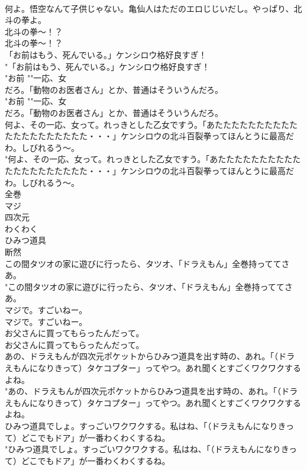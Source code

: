 \documentclass[8pt]{extreport}
\begin{document}
\begin{CJK}{UTF8}{min}
\\	何よ。悟空なんて子供じゃない。亀仙人はただのエロじじいだし。やっぱり、北斗の拳よ。 
\\	北斗の拳～！？	
\\	北斗の拳～！？ 
\\	「お前はもう、死んでいる。」ケンシロウ格好良すぎ！	
\\	"「お前はもう、死んでいる。」ケンシロウ格好良すぎ！ 
\\	"お前 ""一応、女
\\	だろ。「動物のお医者さん」とか、普通はそういうんだろ。
\\	"お前 ""一応、女
\\	だろ。「動物のお医者さん」とか、普通はそういうんだろ。 
\\	何よ、その一応、女って。れっきとした乙女ですう。「あたたたたたたたたたたたたたたたたたたたた・・・」ケンシロウの北斗百裂拳ってほんとうに最高だわ。しびれるう～。	
\\	"何よ、その一応、女って。れっきとした乙女ですう。「あたたたたたたたたたたたたたたたたたたたた・・・」ケンシロウの北斗百裂拳ってほんとうに最高だわ。しびれるう～。 
\\	全巻
\\	マジ
\\	四次元
\\	わくわく
\\	ひみつ道具
\\	断然
\\	この間タツオの家に遊びに行ったら、タツオ、「ドラえもん」全巻持っててさあ。	
\\	"この間タツオの家に遊びに行ったら、タツオ、「ドラえもん」全巻持っててさあ。 
\\	マジで。すごいねー。	
\\	マジで。すごいねー。 
\\	お父さんに買ってもらったんだって。	
\\	お父さんに買ってもらったんだって。 
\\	あの、ドラえもんが四次元ポケットからひみつ道具を出す時の、あれ。「（ドラえもんになりきって）タケコプター」ってやつ。あれ聞くとすごくワクワクするよね。	
\\	"あの、ドラえもんが四次元ポケットからひみつ道具を出す時の、あれ。「（ドラえもんになりきって）タケコプター」ってやつ。あれ聞くとすごくワクワクするよね。 
\\	ひみつ道具でしょ。すっごいワクワクする。私はね、「（ドラえもんになりきって）どこでもドア」が一番わくわくするね。	
\\	"ひみつ道具でしょ。すっごいワクワクする。私はね、「（ドラえもんになりきって）どこでもドア」が一番わくわくするね。 

\end{CJK}
\end{document}
